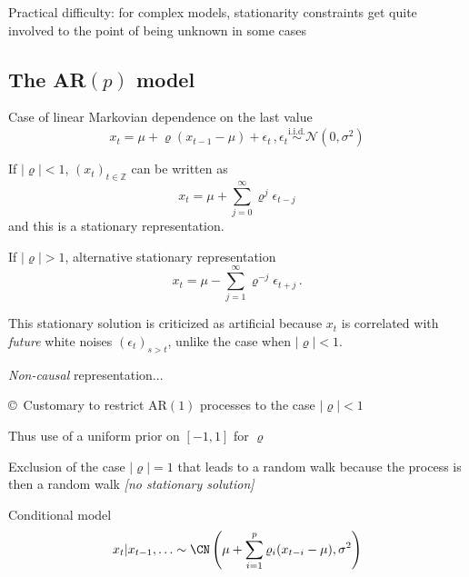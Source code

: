 \begin{slide}
\end{slide}\begin{slide}

Practical difficulty: for complex models, 
stationarity constraints get quite involved to the
point of being unknown in some cases 

\end{slide}\subsection{The AR$(p)$ model}\begin{slide}

Case of linear Markovian dependence on the last value
$$
x_t=\mu + \varrho (x_{t-1} -\mu) + \epsilon_t \,,\epsilon_t
\stackrel{\text{i.i.d.}}{\sim} \mathscr{N}(0,\sigma^2)
$$

\vs\pause
If $|\varrho|<1$, $(x_t)_{t\in\mathbb{Z}}$ can be written as
$$
x_t=\mu + \sum_{j=0}^\infty \varrho^j \epsilon_{t-j}
$$
and this is a stationary representation.

\end{slide}\begin{slide}

If $|\varrho|>1$, alternative stationary representation
$$
x_t=\mu-\sum_{j=1}^\infty \varrho^{-j} \epsilon_{t+j}\,.
$$

\vs\pause
This stationary solution is criticized as 
artificial because $x_t$ is correlated with {\em
future} white noises $(\epsilon_t)_{s>t}$, unlike the case when $|\varrho|<1$.

{\em Non-causal} representation...

\end{slide}\begin{slide}

\copyright~Customary to restrict AR$(1)$
processes to the case $|\varrho|<1$ 

\pause \vs 
Thus use of a uniform prior on $[-1,1]$ for $\varrho$

\vs\pause\small
Exclusion of the case $|\varrho|=1$ that leads to a random walk
because the process is then a random walk {\em [no stationary solution]}
\normalsize

\end{slide}\begin{slide}

Conditional model
\[
x_t|x_{t-1},\ldots \sim
\CN\left(\mu + \sum_{i=1}^p \varrho_i (x_{t-i}-\mu),\sigma^2\right)
\]


\end{slide}
